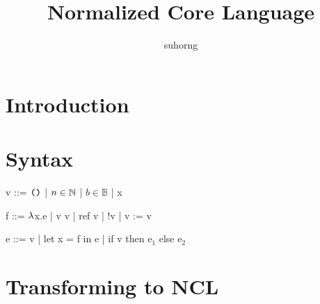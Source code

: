\documentclass{article}
\begin{document}
\title{Normalized Core Language}
\author{suhorng}
\maketitle
\section{Introduction}
\section{Syntax}
\begin{minipage}{\textwidth}
\begin{minipage}[t]{0.33\textwidth}

\begin{code}
v  ::=  $\text{\texttt{()}}$
    |     $n\in\mathbb N$
    |     $b\in\mathbb{B}$
    |     x
\end{code}

\end{minipage}
\begin{minipage}[t]{0.33\textwidth}

\begin{code}
f  ::=  $\lambda$x.e
    |    v v
    |    ref v
    |    !v
    |    v := v
\end{code}

\end{minipage}
\begin{minipage}[t]{0.33\textwidth}

\begin{code}
e  ::=  v
    |    let x = f in e
    |    if v then e$_1$ else e$_2$
\end{code}

\end{minipage}
\end{minipage}
\section{Transforming to NCL}
\end{document}
